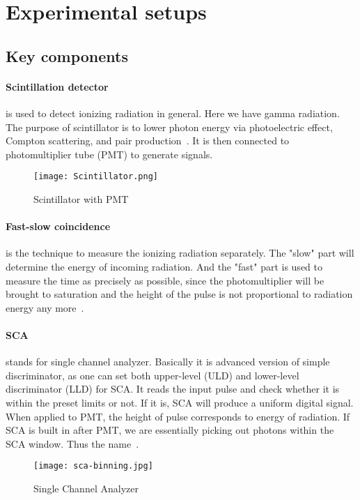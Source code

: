 \section{Experimental setups}

\subsection{Key components}
\paragraph{Scintillation detector}
is used to detect ionizing radiation in general. Here we have gamma radiation. The purpose of scintillator is to lower photon energy via photoelectric effect, Compton scattering, and pair production~\cite{wermes}. It is then connected to photomultiplier tube (PMT) to generate signals.
\begin{figure}[ht]
   \centering
   \texttt{[image: Scintillator.png]}
   \caption{Scintillator with PMT~\cite{wikiScin}}%
\end{figure}


\paragraph{Fast-slow coincidence} is the technique to measure the ionizing radiation separately. The "slow" part will determine the energy of incoming radiation. And the "fast" part is used to measure the time as precisely as possible, since the photomultiplier will be brought to saturation and the height of the pulse is not proportional to radiation energy any more~\cite{IACI1968103}. 

\paragraph{SCA} stands for single channel analyzer. Basically it is advanced version of simple discriminator, as one can set both upper-level (ULD) and lower-level discriminator (LLD) for SCA. It reads the input pulse and check whether it is within the preset limits or not. If it is, SCA will produce a uniform digital signal.
When applied to PMT, the height of pulse corresponds to energy of radiation. If SCA is built in after PMT, we are essentially picking out photons within the SCA window. Thus the name~\cite{SCAmanual}.

\begin{figure}[ht]
	\centering
	\texttt{[image: sca-binning.jpg]}
	\caption{Single Channel Analyzer~\cite{wikiScin}}%
\end{figure}


